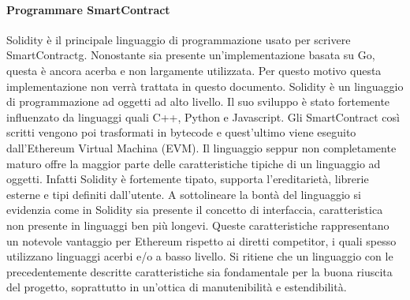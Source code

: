\paragraph{Programmare SmartContract}
Solidity è il principale linguaggio di programmazione usato per scrivere \gls{SmartContractg}. Nonostante sia presente un’implementazione basata su Go, questa è ancora acerba e non largamente utilizzata. Per questo motivo questa implementazione non verrà trattata in questo documento.
Solidity è un linguaggio di programmazione ad oggetti ad alto livello. Il suo sviluppo è stato fortemente influenzato da linguaggi quali C++, Python e Javascript. Gli SmartContract così scritti vengono poi trasformati in bytecode e quest’ultimo viene eseguito dall’Ethereum Virtual Machina (EVM).
Il linguaggio seppur non completamente maturo offre la maggior parte delle caratteristiche tipiche di un linguaggio ad oggetti. Infatti Solidity è fortemente tipato, supporta l’ereditarietà, librerie esterne e tipi definiti dall’utente. A sottolineare la bontà del linguaggio si evidenzia come in Solidity sia presente il concetto di interfaccia, caratteristica non presente in linguaggi ben più longevi. 
Queste caratteristiche rappresentano un notevole vantaggio per Ethereum rispetto ai diretti competitor, i quali spesso utilizzano linguaggi acerbi e/o a basso livello. Si ritiene che un linguaggio con le precedentemente descritte caratteristiche sia fondamentale per la buona riuscita del progetto, soprattutto in un’ottica di manutenibilità e estendibilità.
